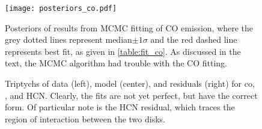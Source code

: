 \begin{figure}%
  \hspace*{\fill}%
  \texttt{[image: posteriors\_co.pdf]}\hfill%
  \hspace*{\fill}%
  \caption{Posteriors of results from MCMC fitting of CO emission, where the grey dotted lines represent median$\pm 1\sigma$ and the red dashed line represents best fit, as given in \ref{table:fit_co}. As discussed in the text, the MCMC algorithm had trouble with the CO fitting.}
  \label{fig:co_posteriors}
\end{figure}




%
%
%
%
%
%



\begin{figure}%
  \centering
    \hspace*{\fill}%
    \vfill%
    \vfill%
    \hspace*{\fill}%
    \caption{Triptychs of data (left), model (center), and residuals (right) for co, \hco, and HCN. Clearly, the fits are not yet perfect, but have the correct form. Of particular note is the HCN residual, which traces the region of interaction between the two disks.}
    \label{fig:dmr_moment_maps}
\end{figure}


